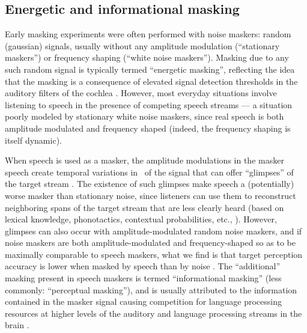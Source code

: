 \subsection{Energetic and informational masking}
Early masking experiments \citep[e.g.,][]{HawkinsStevens1950,Tolhurst1957,PollackPickett1958} were often performed with noise maskers: random (gaussian) signals, usually without any amplitude modulation (“stationary maskers”) or frequency shaping (“white noise maskers”).  Masking due to any such random signal is typically termed “energetic masking”, reflecting the idea that the masking is a consequence of elevated signal detection thresholds in the auditory filters of the cochlea \citep{DurlachEtAl2003,xxx}.  However, most everyday situations involve listening to speech in the presence of competing speech streams — a situation poorly modeled by stationary white noise maskers, since real speech is both amplitude modulated and frequency shaped (indeed, the frequency shaping is itself dynamic).  

When speech is used as a masker, the amplitude modulations in the masker speech create temporal variations in \snr\ of the signal that can offer “glimpses” of the target stream \citep{FestenPlomp1990}.  The existence of such glimpses make speech a (potentially) worse masker than stationary noise, since listeners can use them to reconstruct neighboring spans of the target stream that are less clearly heard (based on lexical knowledge, phonotactics, contextual probabilities, etc., \citep{xxx}).  However, glimpses can also occur with amplitude-modulated random noise maskers, and if noise maskers are both amplitude-modulated and frequency-shaped so as to be maximally comparable to speech maskers, what we find is that target perception accuracy is lower when masked by speech than by noise \citep[e.g.,][]{CarhartEtAl1969,LewisEtAl1988,SimpsonCooke2005}.  The “additional” masking present in speech maskers is termed “informational masking” (less commonly: “perceptual masking”), and is usually attributed to the information contained in the masker signal causing competition for language processing resources at higher levels of the auditory and language processing streams in the brain \citep{DurlachEtAl2003,xxx}.

